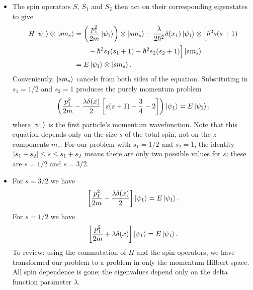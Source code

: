 \documentclass[11pt, a4paper]{article}
\begin{document}
\begin{itemize}
	\item The spin operators $ S $, $ S_{1} $ and $ S_{2} $ then act on their corresponding eigenstates to give
	\begin{align*}
		H \ket{\psi_{1}} \otimes \ket{sm_{s}} &= \left(\frac{p_{1}^{2}}{2m}\ket{\psi_{1}}\right)\otimes \ket{sm_{s}} - \frac{\lambda}{2\hbar^{2}} \delta (x_{1})\ket{\psi_{1}}\otimes \Big[\hbar^{2}s(s+1) \\
		&{} \qquad  - \hbar^{2}s_{1}(s_{1} + 1) - \hbar^{2}s_{2}(s_{2} + 1)\Big] \ket{sm_{s}} \\
		&= E \ket{\psi_{1}}\otimes \ket{sm_{s}}.
	\end{align*}
	Conveniently, $ \ket{sm_{s}} $ cancels from both sides of the equation. Substituting in $ s_{1} = 1/2 $ and $ s_{2} = 1 $ produces the purely momentum problem
	\begin{equation*}
		\left(\frac{p_{1}^{2}}{2m} - \frac{\lambda \delta(x)}{2}\left[s(s+1) - \frac{3}{4} - 2\right]\right)\ket{\psi_{1}} = E \ket{\psi_{1}},
	\end{equation*}
	where $ \ket{\psi_{1}} $ is the first particle's momentum wavefunction. Note that this equation depends only on the size $ s $ of the total spin, not on the $ z $ components $ m_{s} $. For our problem with $ s_{1} = 1/2 $ and $ s_{2} = 1 $, the identity $ \abs{s_{1} - s_{2}} \leq s \leq s_{1} + s_{2} $ means there are only two possible values for $ s $; these are $ s = 1/2 $ and $ s = 3/2 $. 
	
	\item For $ s = 3/2 $ we have
	\begin{equation*}
		\left[\frac{p_{1}^{2}}{2m} - \frac{\lambda \delta(x)}{2}\right]\ket{\psi_{1}} = E \ket{\psi_{1}}.
	\end{equation*}
	For $ s = 1/2 $ we have
	\begin{equation*}
		\left[\frac{p_{1}^{2}}{2m} + \lambda \delta(x)\right]\ket{\psi_{1}} = E \ket{\psi_{1}}.
	\end{equation*}
	To review: using the commutation of $ H $ and the spin operators, we have transformed our problem to a problem in only the momentum Hilbert space. All spin dependence is gone; the eigenvalues depend only on the delta function parameter $ \lambda $. 	
\end{itemize}
\end{document}
